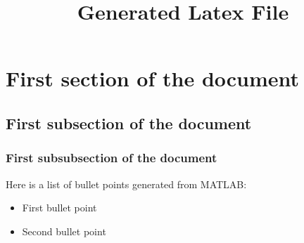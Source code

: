 \documentclass[10pt]{article}
\title{Generated Latex File}
\date{}
\begin{document}
\maketitle
\tableofcontents

\section{First section of the document}
\subsection{First subsection of the document}
\subsubsection{First subsubsection of the document}
Here is a list of bullet points generated from MATLAB:
\begin{itemize}
\item First bullet point
\item Second bullet point
\end{itemize}
\end{document}
